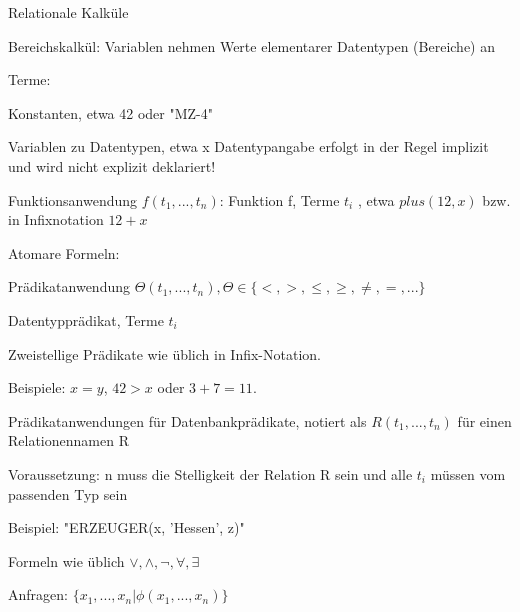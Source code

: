 \documentclass[a4paper]{article}
\begin{document}
\begin{multicols}{3}
    Relationale Kalküle
    \begin{itemize*}
        \item Bereichskalkül: Variablen nehmen Werte elementarer Datentypen (Bereiche) an
        \begin{itemize*}
            \item Terme:
            \begin{itemize*}
                \item Konstanten, etwa 42 oder "MZ-4"
                \item Variablen zu Datentypen, etwa x Datentypangabe erfolgt in der Regel implizit und wird nicht explizit deklariert!
                \item Funktionsanwendung $f(t_1,...,t_n )$: Funktion f, Terme $t_i$ , etwa $plus(12, x)$ bzw. in Infixnotation $12 + x$
            \end{itemize*}
            \item Atomare Formeln:
            \begin{itemize*}
                \item Prädikatanwendung $\Theta(t_1,...,t_n ), \Theta\in\{<, >, \leq, \geq, \not = , =,...\}$
                \begin{itemize*}
                    \item Datentypprädikat, Terme $t_i$
                    \item Zweistellige Prädikate wie üblich in Infix-Notation.
                    \item Beispiele: $x = y$, $42 > x$ oder $3 + 7 = 11$.
                \end{itemize*}
                \item Prädikatanwendungen für Datenbankprädikate, notiert als $R(t_1,...,t_n)$ für einen Relationennamen R
                \begin{itemize*}
                    \item Voraussetzung: n muss die Stelligkeit der Relation R sein und alle $t_i$ müssen vom passenden Typ sein
                    \item Beispiel: "ERZEUGER(x, ’Hessen’, z)"
                \end{itemize*}
                \item Formeln wie üblich $\vee, \wedge, \neg, \forall, \exists$
            \end{itemize*}
            \item Anfragen: $\{x_1,..., x_n | \phi(x_1,..., x_n )\}$
            \begin{itemize*}

\end{itemize*}
\end{itemize*}
\end{itemize*}
\end{multicols}
\end{document}
